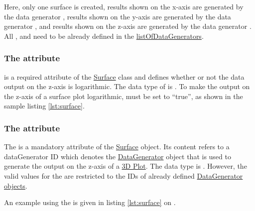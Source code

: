 Here, only one surface is created, results shown on the x-axis are generated by the data generator , results shown on the y-axis are generated by the data generator , and results shown on the z-axis are generated by the data generator . All ,  and  need to be already defined in the \hyperref[sec:listOfDataGenerators]{listOfDataGenerators}.


\subsubsection{The  attribute}
\label{sec:logZ}
 is a required attribute of the \hyperref[class:surface]{Surface} class and defines whether or not the data output on the z-axis is logarithmic. The data type of  is .
To make the output on the z-axis of a surface plot logarithmic,  must be set to ``true'', as shown in the sample listing \ref{lst:surface}.

\subsubsection{The  attribute}
\label{sec:zDataReference}
The  is a mandatory attribute of the \hyperref[class:surface]{Surface} object. Its content refers to a dataGenerator ID which denotes the \hyperref[class:dataGenerator]{DataGenerator} object that is used to generate the output on the z-axis of a \hyperref[class:plot3D]{3D Plot}.
The  data type is . However, the valid values for the  are restricted to the IDs of already defined \hyperref[class:dataGenerator]{DataGenerator objects}.

An example using the  is given in listing \ref{lst:surface} on .

